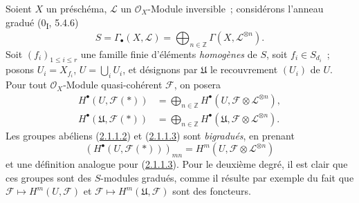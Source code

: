 \begin{env}[2.1.1]
\label{III.2.1.1-fr}
Soient $X$ un préschéma, $\mathcal L$ un $\mathcal O_X$-Module inversible~;
considérons l'anneau gradué (0\textsubscript{I}, 5.4.6)
\begin{equation}
\label{III.2.1.1.1-fr}
\tag{2.1.1.1}
S=\Gamma_\bullet(X,\mathcal L)
=\bigoplus_{n\in\mathbb Z}\Gamma(X,\mathcal L^{\otimes n}).
\end{equation}
Soit $(f_i)_{1\leq i\leq r}$ une famille finie d'éléments \emph{homogènes}
de $S$, soit $f_i\in S_{d_i}$~; posons
$U_i=X_{f_i}$, $U=\bigcup_iU_i$, et désignons par $\mathfrak U$ le
recouvrement $(U_i)$ de $U$. Pour tout $\mathcal O_X$-Module quasi-cohérent
$\mathcal F$, on posera
\begin{align}
\label{III.2.1.1.2-fr}
\tag{2.1.1.2}
H^\bullet(U,\mathcal F(*))
&=\bigoplus_{n\in\mathbb Z}
H^\bullet(U,\mathcal F\otimes\mathcal L^{\otimes n}),\\
\label{III.2.1.1.3-fr}
\tag{2.1.1.3}
H^\bullet(\mathfrak U,\mathcal F(*))
&=\bigoplus_{n\in\mathbb Z}
H^\bullet(\mathfrak U,\mathcal F\otimes\mathcal L^{\otimes n}).
\end{align}
Les groupes abéliens (\hyperref[III.2.1.1.2-fr]{2.1.1.2}) et
(\hyperref[III.2.1.1.3-fr]{2.1.1.3}) sont \emph{bigradués}, en prenant
\[
(H^\bullet(U,\mathcal F(*)))_{mn}
=H^m(U,\mathcal F\otimes\mathcal L^{\otimes n})
\]
et une définition analogue pour
(\hyperref[III.2.1.1.3-fr]{2.1.1.3}). Pour le deuxième degré, il est clair
que ces groupes sont des $S$-modules gradués, comme il résulte par exemple du
fait que $\mathcal F\mapsto H^m(U,\mathcal F)$ et
$\mathcal F\mapsto H^m(\mathfrak U,\mathcal F)$ sont des foncteurs.
\end{env}

